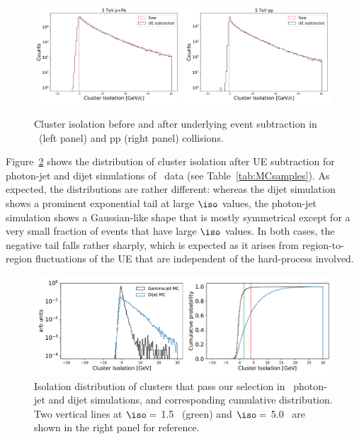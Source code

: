 \begin{figure}[h]
\center
\includegraphics[width=0.49\textwidth]{Data_Analysis/Isolation/IsolationWithUESubtraction_Skimmed_13def_root}
\includegraphics[width=0.49\textwidth]{Data_Analysis/Isolation/IsolationWithUESubtraction_Skimmed_17q_root}
\caption{Cluster isolation before and after underlying event subtraction in \pPb~(left panel) and pp (right panel) collisions.}
\label{fig:iso_ue}
\end{figure}

Figure~\ref{MC_Isolation} shows the distribution of cluster isolation after UE subtraction for photon-jet and dijet simulations of \pPb~data (see Table~\ref{tab:MCsamples}). As expected, the distributions are rather different: whereas the dijet simulation shows a prominent exponential tail at large $\iso$ values, the photon-jet simulation shows a Gaussian-like shape that is mostly symmetrical except for a very small fraction of events that have large $\iso$ values. In both cases, the negative tail falls rather sharply, which is expected as it arises from region-to-region fluctuations of the UE that are independent of the hard-process involved. 

\begin{figure}[h]
\center
\includegraphics[width=1.0\textwidth]{Data_Analysis/Isolation/IsolationMCsignal_Skimmed_17g6a1_pthat1_4L_root}
\caption{Isolation distribution of clusters that pass our selection in \pPb~photon-jet and dijet simulations, and corresponding cumulative distribution. Two vertical lines at $\iso=$ 1.5 \GeVc~(green) and $\iso=$ 5.0 \GeVc~are shown in the right panel for reference.}
\label{MC_Isolation}
\end{figure}

